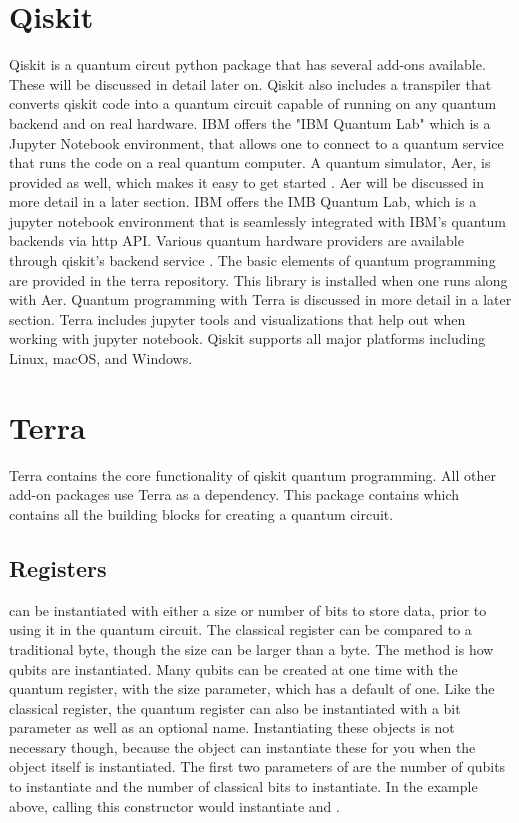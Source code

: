 \documentclass[conference]{IEEEtran}
\begin{document}
\section{Qiskit}
Qiskit is a quantum circut python package that has several add-ons available. These will be discussed in detail later on. 
Qiskit also includes a transpiler that converts qiskit code into a quantum circuit capable of running on any quantum backend and on real hardware. 
IBM offers the "IBM Quantum Lab" which is a Jupyter Notebook environment, that allows one to connect to a quantum service that runs the code on a real quantum computer.
A quantum simulator, Aer, is provided as well, which makes it easy to get started \cite{b4}.
Aer will be discussed in more detail in a later section. 
IBM offers the IMB Quantum Lab, which is a jupyter notebook environment that is seamlessly integrated with IBM's quantum backends via http API.
Various quantum hardware providers are available through qiskit's backend service \cite{b5}. 
The basic elements of quantum programming are provided in the terra repository. 
This library is installed when one runs  along with Aer. 
Quantum programming with Terra is discussed in more detail in a later section. 
Terra includes jupyter tools and visualizations that help out when working with jupyter notebook. 
Qiskit supports all major platforms including Linux, macOS, and Windows. 

\section{Terra}
Terra contains the core functionality of qiskit quantum programming. 
All other add-on packages use Terra as a dependency. 
This package contains  which contains all the building blocks for creating a quantum circuit. 

\subsection{Registers}
 can be instantiated with either a size or number of bits to store data, prior to using it in the quantum circuit.
The classical register can be compared to a traditional byte, though the size can be larger than a byte.
The  method is how qubits are instantiated.
Many qubits can be created at one time with the quantum register, with the size parameter, which has a default of one. 
Like the classical register, the quantum register can also be instantiated with a bit parameter as well as an optional name.
Instantiating these objects is not necessary though, because the  object can instantiate these for you when the object itself is instantiated. 
The first two parameters of  are the number of qubits to instantiate and the number of classical bits to instantiate.
In the example above, calling this constructor would instantiate  and . 
\end{document}
